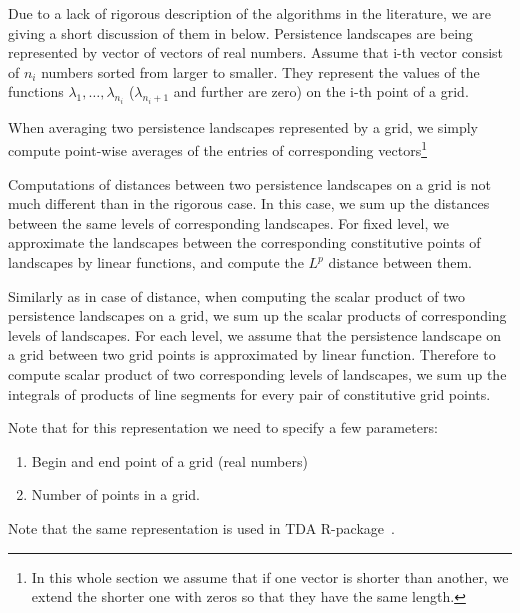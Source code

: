 \documentclass[11pt]{article}
\begin{document}
Due to a lack of rigorous description of the algorithms in the literature, we are giving a short discussion of them in below. Persistence landscapes are being represented by vector of vectors of real numbers. Assume that i-th vector consist of $n_i$ numbers sorted from larger to smaller. They represent the values of the functions $\lambda_1,\ldots,\lambda_{n_i}$ ($\lambda_{n_i+1}$ and further are zero) on the i-th point of a grid. 

When averaging two persistence landscapes represented by a grid, we simply compute point-wise averages of the entries of corresponding vectors\footnote{In this whole section we assume that if one vector is shorter than another, we extend the shorter one with zeros so that they have the same length.}

Computations of distances between two persistence landscapes on a grid is not much different than in the rigorous case. In this case, we sum up the distances between the same levels of corresponding landscapes. For fixed level, we approximate the landscapes between the corresponding constitutive points of landscapes by linear functions, and compute the $L^p$ distance between them.

Similarly as in case of distance, when computing the scalar product of two persistence landscapes on a grid, we sum up the scalar products of corresponding levels of landscapes. For each level, we assume that the persistence landscape on a grid between two grid points is approximated by linear function. Therefore to compute scalar product of two corresponding levels of landscapes, we sum up the integrals of products of line segments for every pair of constitutive grid points. 

Note that for this representation we need to specify a few parameters:
\begin{enumerate}
\item Begin and end point of a grid (real numbers)

\item Number of points in a grid.
\end{enumerate}

Note that the same representation is used in TDA R-package~\cite{tda}.
\end{document}
